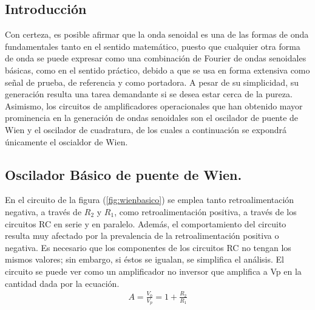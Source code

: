 


\subsection{Introducción}
Con certeza, es posible afirmar que la onda senoidal es una de las formas de onda fundamentales tanto en el sentido matemático, puesto que cualquier otra forma de onda se puede expresar como una combinación de Fourier de ondas senoidales básicas, como en el
sentido práctico, debido a que se usa en forma extensiva como señal de prueba, de referencia
y como portadora. A pesar de su simplicidad, su generación resulta una tarea demandante si
se desea estar cerca de la pureza. Asimismo, los circuitos de amplificadores operacionales que han obtenido
mayor prominencia en la generación de ondas senoidales son el oscilador de puente de Wien
y el oscilador de cuadratura, de los cuales a continuación se expondrá únicamente el oscialdor de Wien.
\subsection{Oscilador Básico de puente de Wien.}
En el circuito de la figura (\ref{fig:wienbasico}) se emplea tanto retroalimentación negativa, a través de $R_2$
y $R_1$, como retroalimentación positiva, a través de los circuitos RC en serie y en paralelo.
Además, el comportamiento del circuito resulta muy afectado por la prevalencia de la retroalimentación positiva o negativa. Es necesario que los componentes de los circuitos RC
no tengan los mismos valores; sin embargo, si éstos se igualan, se simplifica el análisis.
El circuito se puede ver como un amplificador no inversor que amplifica a Vp en la
cantidad dada por la ecuación.
 \begin{align}
 A=\frac{V_0}{V_p}=1+\frac{R_2}{R_1}
 \end{align}

